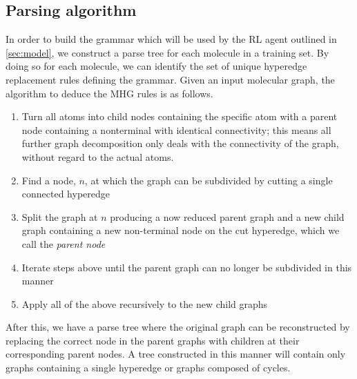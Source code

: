 \documentclass{article}
\begin{document}
\subsection{Parsing algorithm}\label{sec:parsing}
In order to build the grammar which will be used by the RL agent outlined in \ref{sec:model}, we  construct a parse tree for each molecule in a training set. By doing so for each molecule, we can identify the set of unique hyperedge replacement rules defining the grammar. Given an input molecular graph, the algorithm to deduce the MHG rules is as follows.
\begin{enumerate}
	\item Turn all atoms into child nodes containing the specific atom with a parent node containing a nonterminal with identical connectivity; this means all further graph decomposition only deals with the connectivity of the graph, without regard to the actual atoms.
	\item Find a node, $n$, at which the graph can be subdivided by cutting a single connected hyperedge 
    \item Split the graph at $n$ producing a now reduced parent graph and a new child graph containing a new non-terminal node on the cut hyperedge, which we call the {\em parent node}
    \item Iterate steps above until the parent graph can no longer be subdivided in this manner
    \item Apply all of the above recursively to the new child graphs
\end{enumerate}
After this, we have a parse tree where the original graph can be reconstructed by replacing the correct node in the parent graphs with children at their corresponding parent nodes. A tree constructed in this manner will contain only graphs containing a single hyperedge or graphs composed of cycles.
\end{document}

